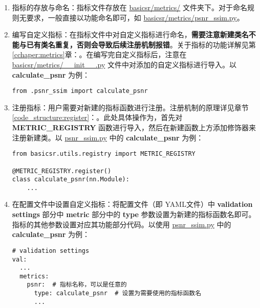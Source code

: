 \documentclass[../main.tex]{subfiles}
\begin{document}
\begin{enumerate}[第 1 步]
    \item 指标的存放与命名：指标文件存放在 \href{https://github.com/XPixelGroup/BasicSR/tree/master/basicsr/metrics}{basicsr/metrics/} 文件夹下。对于命名规则无要求，一般直接以功能命名即可，如 \href{https://github.com/XPixelGroup/BasicSR/tree/master/basicsr/metrics/psnr_ssim.py}{basicsr/metrics/psnr\_ssim.py}。

    \item 编写自定义指标：在指标文件中对自定义指标进行命名，\textbf{需要注意新建类名不能与已有类名重复，否则会导致后续注册机制报错}。关于指标的功能详解见第\ref{cchaper:metrics}章：。在编写完自定义指标后，注意在 \href{https://github.com/XPixelGroup/BasicSR/tree/master/basicsr/metrics/__init__.py}{basicsr/metrics/\_\_init\_\_.py} 文件中对添加的自定义指标进行导入。以 \textbf{calculate\_psnr} 为例：
\begin{verbatim}
from .psnr_ssim import calculate_psnr
\end{verbatim}

    \item 注册指标：用户需要对新建的指标函数进行注册。注册机制的原理详见章节\ref{code_structure:register}：。此处具体操作为，首先对 \textbf{METRIC\_REGISTRY} 函数进行导入，然后在新建函数上方添加修饰器来注册新建类。以 \href{https://github.com/XPixelGroup/BasicSR/tree/master/basicsr/metrics/psnr_ssim.py}{psnr\_ssim.py} 中的 \textbf{calculate\_psnr} 为例：
\begin{verbatim}
from basicsr.utils.registry import METRIC_REGISTRY

@METRIC_REGISTRY.register()
class calculate_psnr(nn.Module):
    ...
\end{verbatim}

    \item 在配置文件中设置自定义指标：将配置文件（即 YAML文件）中 \textbf{validation settings} 部分中 \textbf{metric} 部分中的  \textbf{type} 参数设置为新建的指标函数名即可。指标的其他参数设置对应其功能部分代码。以使用 \href{https://github.com/XPixelGroup/BasicSR/tree/master/basicsr/metrics/psnr_ssim.py}{psnr\_ssim.py} 中的 \textbf{calculate\_psnr} 为例：
\begin{verbatim}
# validation settings
val:
  ...
  metrics:
    psnr:  # 指标名称，可以是任意的
      type: calculate_psnr  # 设置为需要使用的指标函数名
      ...
\end{verbatim}
\end{enumerate}
\end{document}
